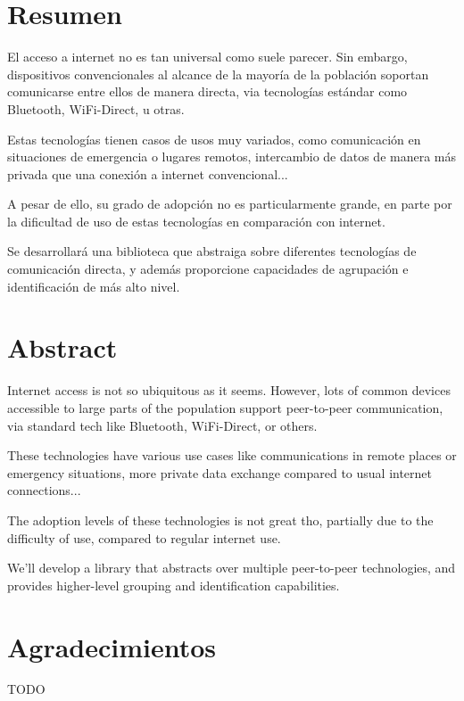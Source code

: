 \section*{Resumen}

El acceso a internet no es tan universal como suele parecer. Sin embargo,
dispositivos convencionales al alcance de la mayoría de la población soportan
comunicarse entre ellos de manera directa, via tecnologías estándar como
Bluetooth, WiFi-Direct, u otras.

Estas tecnologías tienen casos de usos muy variados, como comunicación en
situaciones de emergencia o lugares remotos, intercambio de datos de manera más
privada que una conexión a internet convencional...

A pesar de ello, su grado de adopción no es particularmente grande, en parte
por la dificultad de uso de estas tecnologías en comparación con internet.

Se desarrollará una biblioteca que abstraiga sobre diferentes tecnologías de
comunicación directa, y además proporcione capacidades de agrupación e
identificación de más alto nivel.

\clearpage

\section*{Abstract}

Internet access is not so ubiquitous as it seems. However, lots of common
devices accessible to large parts of the population support peer-to-peer
communication, via standard tech like Bluetooth, WiFi-Direct, or others.

These technologies have various use cases like communications in remote places
or emergency situations, more private data exchange compared to usual internet
connections...

The adoption levels of these technologies is not great tho, partially due to
the difficulty of use, compared to regular internet use.

We'll develop a library that abstracts over multiple peer-to-peer technologies,
and provides higher-level grouping and identification capabilities.

\clearpage

\printglossaries

\clearpage

\section*{Agradecimientos}

TODO
